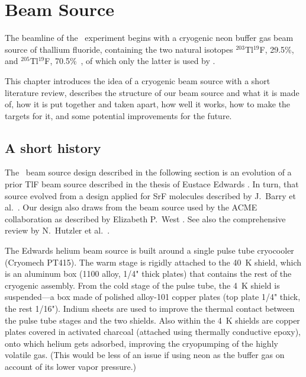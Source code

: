 \section{Beam Source}
\label{beam_source_ch}

The beamline of the \CENTREX\ experiment begins with a cryogenic neon buffer gas
beam source of thallium fluoride, containing the two natural isotopes
$^{203}$Tl$^{19}$F, 29.5\%, and $^{205}$Tl$^{19}$F, 70.5\%\
\cite{kondev2021nubase2020}, of which only the latter is used by \CENTREX.

This chapter introduces the idea of a cryogenic
beam source with a short literature review, describes the structure of our beam
source and what it is made of, how it is put together and taken apart, how well
it works, how to make the targets for it, and some potential improvements for
the future.

\subsection{A short history}
\label{beam_source_history}

The \CENTREX\ beam source design described in the following section is an
evolution of a prior TlF beam source described in the thesis of Eustace Edwards
\cite{edwards2023thesis}. In turn, that source evolved from a design applied
for SrF molecules described by J.\ Barry et al.\ \cite{barry2011bright}. Our
design also draws from the beam source used by the ACME collaboration as
described by Elizabeth P.\ West \cite{west2017thesis}. See also the
comprehensive review by N.\ Hutzler et al.\ \cite{hutzler2012buffer}.

The Edwards \cite{edwards2023thesis} helium beam source is built around a single
pulse tube cryocooler (Cryomech PT415). The warm stage is rigidly attached to
the 40~K shield, which is an aluminum box (1100 alloy, 1/4" thick plates) that
contains the rest of the cryogenic assembly. From the cold stage of the pulse
tube, the 4~K shield is suspended---a box made of polished alloy-101 copper
plates (top plate 1/4" thick, the rest 1/16"). Indium sheets are used to improve
the thermal contact between the pulse tube stages and the two shields. Also
within the 4~K shields are copper plates covered in activated charcoal (attached
using thermally conductive epoxy), onto which helium gets adsorbed, improving
the cryopumping of the highly volatile gas. (This would be less of an issue if
using neon as the buffer gas on account of its lower vapor pressure.)

